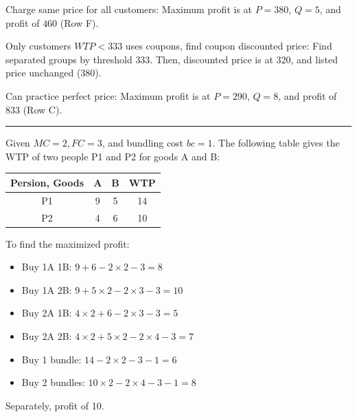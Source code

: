 \documentclass[a4paper]{article}
\begin{document}
\begin{multicols*}{3}
    Charge same price for all customers: Maximum profit is at $P=380$, $Q=5$, and profit of $460$ (Row F).

    Only customers $WTP<333$ uses coupons, find coupon discounted price: Find separated groups by threshold $333$. Then, discounted price is at $320$, and listed price unchanged ($380$).

    Can practice perfect price: Maximum profit is at $P=290$, $Q=8$, and profit of $833$ (Row C).


    \rule{1\linewidth}{0.4pt}

    Given $MC=2, FC=3$, and bundling cost $bc=1$. The following table gives the WTP of two people P1 and P2 for goods A and B:

    \begin{tabular}{|c|c|c|c|}
        \hline
        Persion, Goods & A & B & WTP \\
        \hline
        P1             & 9 & 5 & 14  \\
        P2             & 4 & 6 & 10  \\
        \hline
    \end{tabular}

    To find the maximized profit:
    \begin{itemize}
        \item Buy 1A 1B: $9 + 6 - 2\times2 - 3 = 8$
        \item Buy 1A 2B: $9 + 5\times2 - 2\times3 - 3 = 10$
        \item Buy 2A 1B: $4\times2 + 6 - 2\times3 - 3 = 5$
        \item Buy 2A 2B: $4\times2 + 5\times2 - 2\times4 - 3 = 7$
        \item Buy 1 bundle: $14 - 2\times2 - 3 - 1 = 6$
        \item Buy 2 bundles: $10\times2 - 2\times4 - 3 - 1 = 8$
    \end{itemize}
    Separately, profit of 10.


\end{multicols*}
\end{document}
